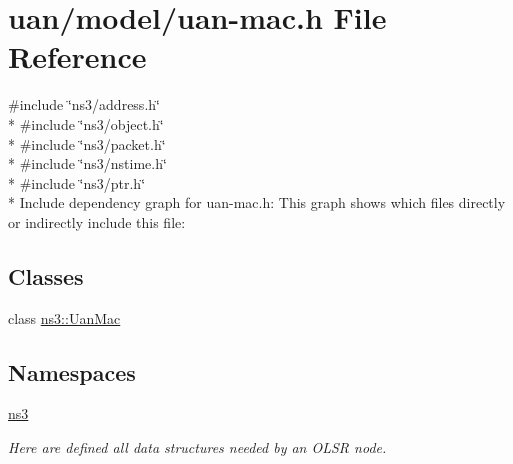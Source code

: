 \hypertarget{uan-mac_8h}{}\section{uan/model/uan-\/mac.h File Reference}
\label{uan-mac_8h}
{\ttfamily \#include \char`\"{}ns3/address.\+h\char`\"{}}\\*
{\ttfamily \#include \char`\"{}ns3/object.\+h\char`\"{}}\\*
{\ttfamily \#include \char`\"{}ns3/packet.\+h\char`\"{}}\\*
{\ttfamily \#include \char`\"{}ns3/nstime.\+h\char`\"{}}\\*
{\ttfamily \#include \char`\"{}ns3/ptr.\+h\char`\"{}}\\*
Include dependency graph for uan-\/mac.h\+:
This graph shows which files directly or indirectly include this file\+:
\subsection*{Classes}
\begin{DoxyCompactItemize}
\item 
class \hyperlink{classns3_1_1UanMac}{ns3\+::\+Uan\+Mac}
\end{DoxyCompactItemize}
\subsection*{Namespaces}
\begin{DoxyCompactItemize}
\item 
 \hyperlink{namespacens3}{ns3}
\begin{DoxyCompactList}\small\item\em Here are defined all data structures needed by an O\+L\+SR node. \end{DoxyCompactList}\end{DoxyCompactItemize}
